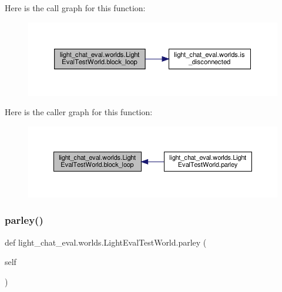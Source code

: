 Here is the call graph for this function\+:
\nopagebreak
\begin{figure}[H]
\begin{center}
\leavevmode
\includegraphics[width=350pt]{classlight__chat__eval_1_1worlds_1_1LightEvalTestWorld_a0d61cdfcfa831bf50078d68edf947e05_cgraph}
\end{center}
\end{figure}
Here is the caller graph for this function\+:
\nopagebreak
\begin{figure}[H]
\begin{center}
\leavevmode
\includegraphics[width=350pt]{classlight__chat__eval_1_1worlds_1_1LightEvalTestWorld_a0d61cdfcfa831bf50078d68edf947e05_icgraph}
\end{center}
\end{figure}
\mbox{\label{classlight__chat__eval_1_1worlds_1_1LightEvalTestWorld_a1cf2385dcf048fff5a7e74b19f8c6917}} 
\subsubsection{\texorpdfstring{parley()}{parley()}}
{\footnotesize\ttfamily def light\+\_\+chat\+\_\+eval.\+worlds.\+Light\+Eval\+Test\+World.\+parley (\begin{DoxyParamCaption}\item[{}]{self }\end{DoxyParamCaption})}



